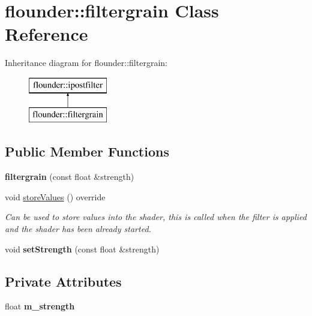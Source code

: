 \hypertarget{classflounder_1_1filtergrain}{}\section{flounder\+:\+:filtergrain Class Reference}
\label{classflounder_1_1filtergrain}
Inheritance diagram for flounder\+:\+:filtergrain\+:\begin{figure}[H]
\begin{center}
\leavevmode
\includegraphics[height=2.000000cm]{classflounder_1_1filtergrain}
\end{center}
\end{figure}
\subsection*{Public Member Functions}
\begin{DoxyCompactItemize}
\item 
\mbox{\label{classflounder_1_1filtergrain_aea807307ca6342c08b8a301ea2dd00c0}} 
{\bfseries filtergrain} (const float \&strength)
\item 
void \hyperlink{classflounder_1_1filtergrain_a0f65f9e8b994f18a4777e4451bdf8b4e}{store\+Values} () override
\begin{DoxyCompactList}\small\item\em Can be used to store values into the shader, this is called when the filter is applied and the shader has been already started. \end{DoxyCompactList}\item 
\mbox{\label{classflounder_1_1filtergrain_ac6f764272481963353642bd7b3d4f746}} 
void {\bfseries set\+Strength} (const float \&strength)
\end{DoxyCompactItemize}
\subsection*{Private Attributes}
\begin{DoxyCompactItemize}
\item 
\mbox{\label{classflounder_1_1filtergrain_a038e33f9dd08809f8242d67336ad4483}} 
float {\bfseries m\+\_\+strength}
\end{DoxyCompactItemize}
